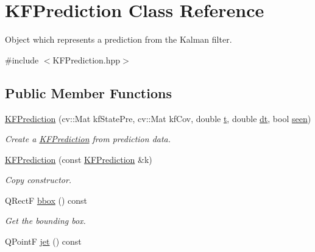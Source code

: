 \hypertarget{classKFPrediction}{}\section{K\+F\+Prediction Class Reference}
\label{classKFPrediction}


Object which represents a prediction from the Kalman filter.  




{\ttfamily \#include $<$K\+F\+Prediction.\+hpp$>$}

\subsection*{Public Member Functions}
\begin{DoxyCompactItemize}
\item 
\hyperlink{classKFPrediction_a5eb59d17d94568138d8e1e596b856372}{K\+F\+Prediction} (cv\+::\+Mat kf\+State\+Pre, cv\+::\+Mat kf\+Cov, double \hyperlink{classKFPrediction_a2580cd73915b169edf669c8cb2271d35}{t}, double \hyperlink{classKFPrediction_a60679b464a34bfad1c5d4875fd172357}{dt}, bool \hyperlink{classKFPrediction_af19dba9fa007ce21c0e36e4e96c3cb54}{seen})
\begin{DoxyCompactList}\small\item\em Create a \hyperlink{classKFPrediction}{K\+F\+Prediction} from prediction data. \end{DoxyCompactList}\item 
\hyperlink{classKFPrediction_af5d081b647f746516773bb6dcdee82aa}{K\+F\+Prediction} (const \hyperlink{classKFPrediction}{K\+F\+Prediction} \&k)\hypertarget{classKFPrediction_af5d081b647f746516773bb6dcdee82aa}{}\label{classKFPrediction_af5d081b647f746516773bb6dcdee82aa}

\begin{DoxyCompactList}\small\item\em Copy constructor. \end{DoxyCompactList}\item 
Q\+RectF \hyperlink{classKFPrediction_a74b69fb51d374dc98e25011e02dbdef5}{bbox} () const \hypertarget{classKFPrediction_a74b69fb51d374dc98e25011e02dbdef5}{}\label{classKFPrediction_a74b69fb51d374dc98e25011e02dbdef5}

\begin{DoxyCompactList}\small\item\em Get the bounding box. \end{DoxyCompactList}\item 
Q\+PointF \hyperlink{classKFPrediction_a100c3ce6d353d7a1480bdf786212dedc}{jet} () const \hypertarget{classKFPrediction_a100c3ce6d353d7a1480bdf786212dedc}{}\label{classKFPrediction_a100c3ce6d353d7a1480bdf786212dedc}


\end{DoxyCompactItemize}
